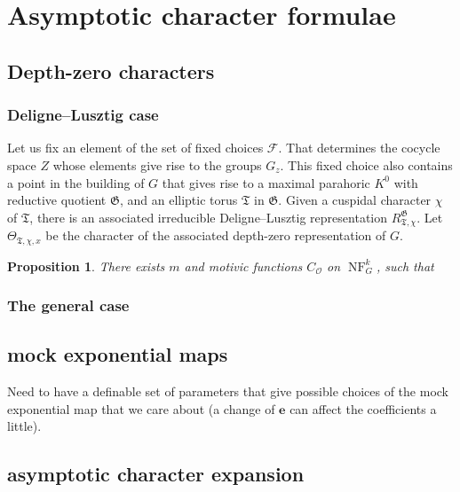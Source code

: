 \documentclass[12pt]{amsart}
\newcommand{\cF}{\mathcal{F}}
\newcommand{\cO}{{\mathcal O}}
\newcommand{\mexp}{\mathbf{e}}
\def\cO{\mathcal{O}}
\def\cF{\mathcal{F}}
\newcommand{\op}[1]{\operatorname{#1}}
\newcommand{\NF}{\op{NF}}
\newcommand{\fG}{\mathfrak G}
\newcommand{\fT}{\mathfrak T}
\theoremstyle{plain}
\newtheorem{prop}[thm]{Proposition}
\theoremstyle{definition}
\begin{document}
\section{Asymptotic character formulae}

\subsection{Depth-zero characters}
\subsubsection{Deligne--Lusztig case} Let us fix an element of the set of fixed choices $\cF$. 
That determines the cocycle space $Z$ whose elements give rise to the groups $G_z$. This fixed 
choice also contains a point in the building of $G$ that gives rise to a maximal parahoric  $K^0$
 with reductive quotient $\fG$, and an elliptic torus $\fT$ in $\fG$. 
Given a cuspidal character $\chi$ of $\fT$, there is an associated irreducible Deligne--Lusztig representation $R_{\fT, \chi}^\fG$. Let $\Theta_{\fT, \chi, x}$ be the character of the associated depth-zero representation of $G$. 
\begin{prop} There exists $m$ and motivic functions $C_{\cO}$ on $\NF_{G}^k$, such that 
\end{prop}

\subsubsection{The general case}

\subsection{mock exponential maps}
Need to have a definable set of parameters that give possible choices of the mock exponential map that we care about (a change of $\mexp$ can affect the coefficients a little). 

\subsection{asymptotic character expansion}
\end{document}
